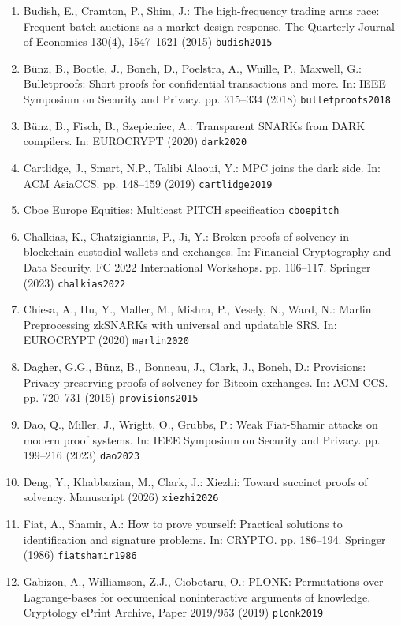 \begin{enumerate}
\item
  Budish, E., Cramton, P., Shim, J.: The high-frequency trading arms race: Frequent batch auctions as a market design response. The Quarterly Journal of Economics 130(4), 1547--1621 (2015) \texttt{budish2015}
\item
  Bünz, B., Bootle, J., Boneh, D., Poelstra, A., Wuille, P., Maxwell, G.: Bulletproofs: Short proofs for confidential transactions and more. In: IEEE Symposium on Security and Privacy. pp. 315--334 (2018) \texttt{bulletproofs2018}
\item
  Bünz, B., Fisch, B., Szepieniec, A.: Transparent SNARKs from DARK compilers. In: EUROCRYPT (2020) \texttt{dark2020}
\item
  Cartlidge, J., Smart, N.P., Talibi Alaoui, Y.: MPC joins the dark side. In: ACM AsiaCCS. pp. 148--159 (2019) \texttt{cartlidge2019}
\item
  Cboe Europe Equities: Multicast PITCH specification \texttt{cboepitch}
\item
  Chalkias, K., Chatzigiannis, P., Ji, Y.: Broken proofs of solvency in blockchain custodial wallets and exchanges. In: Financial Cryptography and Data Security. FC 2022 International Workshops. pp. 106--117. Springer (2023) \texttt{chalkias2022}
\item
  Chiesa, A., Hu, Y., Maller, M., Mishra, P., Vesely, N., Ward, N.: Marlin: Preprocessing zkSNARKs with universal and updatable SRS. In: EUROCRYPT (2020) \texttt{marlin2020}
\item
  Dagher, G.G., Bünz, B., Bonneau, J., Clark, J., Boneh, D.: Provisions: Privacy-preserving proofs of solvency for Bitcoin exchanges. In: ACM CCS. pp. 720--731 (2015) \texttt{provisions2015}
\item
  Dao, Q., Miller, J., Wright, O., Grubbs, P.: Weak Fiat-Shamir attacks on modern proof systems. In: IEEE Symposium on Security and Privacy. pp. 199--216 (2023) \texttt{dao2023}
\item
  Deng, Y., Khabbazian, M., Clark, J.: Xiezhi: Toward succinct proofs of solvency. Manuscript (2026) \texttt{xiezhi2026}
\item
  Fiat, A., Shamir, A.: How to prove yourself: Practical solutions to identification and signature problems. In: CRYPTO. pp. 186--194. Springer (1986) \texttt{fiatshamir1986}
\item
  Gabizon, A., Williamson, Z.J., Ciobotaru, O.: PLONK: Permutations over Lagrange-bases for oecumenical noninteractive arguments of knowledge. Cryptology ePrint Archive, Paper 2019/953 (2019) \texttt{plonk2019}

\end{enumerate}
